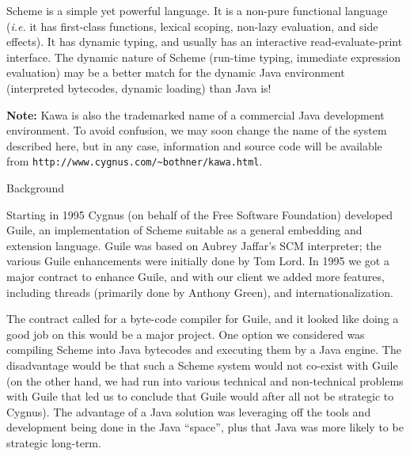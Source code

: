 \documentclass[twocolumn]{article}
\makeatletter
\def\section{\@startsection {section}{1}{\z@}
   {14pt plus 2pt minus 2pt}{12pt plus 2pt minus 2pt} {\large\bf}}
\makeatother
\begin{document}
Scheme is a simple yet powerful language.  It is a
non-pure functional language ({\it i.e.} it has first-class
functions, lexical scoping, non-lazy evaluation, and side
effects).  It has dynamic typing, and usually has an
interactive read-evaluate-print interface.  The dynamic
nature of Scheme (run-time typing, immediate expression
evaluation) may be a better match for the dynamic Java
environment (interpreted bytecodes, dynamic loading) than
Java is!

{\bf Note:}  Kawa is also the trademarked name of a commercial Java
development environment.  To avoid confusion, we may soon change
the name of the system described here, but in any case, information
and source code will be available
from {\tt http:\discretionary{}{}{}//www.cygnus.com/\discretionary{}{}{}\verb|~bothner|/\discretionary{}{}{}kawa.html}.

%

\section{Background}

Starting in 1995 Cygnus (on behalf of the Free Software Foundation)
developed Guile, an implementation of Scheme suitable as a general
embedding and extension language.  Guile was based on
Aubrey Jaffar's SCM interpreter;  the various Guile enhancements
were initially done by Tom Lord.  In 1995 we got a major contract
to enhance Guile, and with our client we added
more features, including threads (primarily done by Anthony Green),
and internationalization.

The contract called for a byte-code
compiler for Guile, and it looked like doing a good job
on this would be a major project.  One option we considered was compiling
Scheme into Java bytecodes and executing them by a Java engine.
The disadvantage would be that such a Scheme system would not
co-exist with Guile (on the other hand, we had run into various
technical and  non-technical problems with Guile that led us to
conclude that Guile would after all not be strategic to Cygnus).
The advantage of a Java solution was leveraging off the
tools and development being done in the Java ``space'', plus that Java
was more likely to be strategic long-term.
\end{document}
